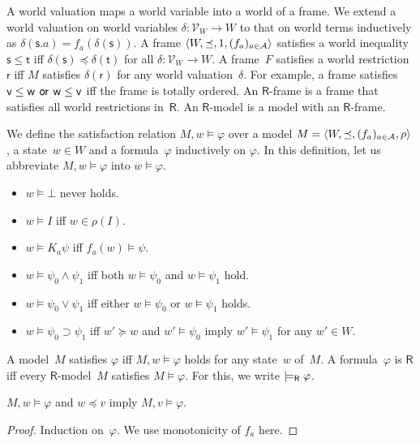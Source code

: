   A world valuation maps a world variable into a world of a frame.
  We extend a world valuation on world variables
  $\delta\colon\mathcal V_W\rightarrow W$ to that on world terms
  inductively as $\delta(\mathsf s.a)=f_a(\delta(\mathsf s))$.
  A frame $\langle{W,\preceq, 1,(f_a)_{a\in\mathcal A}}\rangle$ satisfies a world inequality
  $\mathsf s\le\mathsf t$ iff $\delta(\mathsf s)\preceq \delta(\mathsf t)$
  for all $\delta\colon\mathcal V_W\rightarrow W$.
  A frame~$F$ satisfies a world restriction $\mathsf r$
  iff $M$ satisfies $\delta(\mathsf r)$ for any world valuation~$\delta$.
  For example, a frame satisfies $\mathsf v\le \mathsf w\,\mathbin{\mathsf{or}}\,\mathsf
  w\le\mathsf v$ iff the frame is totally ordered.
  An $\mathsf R$-frame is a frame that
  satisfies all world restrictions in~$\mathsf R$.
  An $\mathsf R$-model is a model with an $\mathsf R$-frame.


  \begin{definition}
   We define the satisfaction relation $M,w\models\varphi$ over a model
   $M = \langle{W,\preceq,(f_a)_{a\in \mathcal A},\rho}\rangle$, a state~$w\in W$ and a
   formula~$\varphi$ inductively on $\varphi$.
   In this definition, let
   us abbreviate $M,w\models \varphi$ into $w\models \varphi$\enspace.
   \newcommand{\m}{}
   \begin{itemize}
    \item $w\models \bot$ never holds.
    \item $w\models I$ iff
	  $w \in
	  \rho(I)$.
    \item	    $w\models K_a \psi$ iff
		    $f_a(w)\models \psi$.
    \item $w\models \psi_0\land\psi_1$ iff both
	  $w\models \psi_0$ and $w\models \psi_1$ hold.
    \item
	 $ w\models \psi_0\vee\psi_1$ iff either
	 $ w\models \psi_0$ or $w\models \psi_1$ holds.
    \item
	 $w\models \psi_0\supset\psi_1$ iff
	 $w'\succeq w$ and $w'\models \psi_0$ imply
	 $w'\models\psi_1$ for any $w'\in W$\enspace.
   \end{itemize}
  \end{definition}
  A model~$M$ satisfies $\varphi$ iff $M,w\models\varphi$ holds for any
  state~$w$ of~$M$.
  A formula~$\varphi$ is  $\mathsf R$ iff
  every $\mathsf R$-model~$M$ satisfies $M\models \varphi$.
  For this, we write $\models_{\mathsf R} \varphi$\enspace.

  \begin{proposition}
   \label{monot}
   $M,w\models\varphi$ and $w\preceq v$ imply
   $M,v\models\varphi$.
  \end{proposition}
  \begin{proof}
   Induction on~$\varphi$.
   We use monotonicity of $f_a$ here.
  \end{proof}

